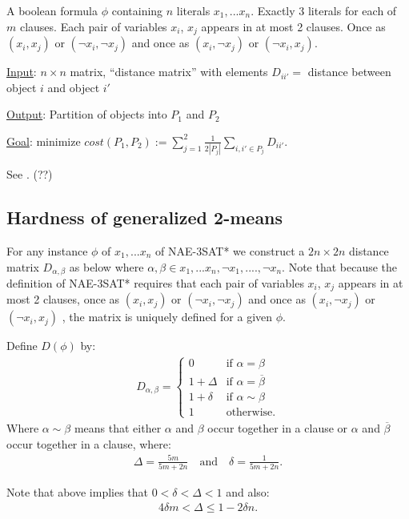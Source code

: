\begin{definition} 
A boolean formula $\phi$ containing $n$ literals $x_1,...x_n$.
Exactly 3 literals for each of $m$ clauses.  Each pair of variables
$x_i$, $x_j$ appears in at most 2 clauses.  Once as $(x_i,x_j)$ or
$(\neg x_i, \neg x_j)$ and once as  $(x_i,\neg x_j)$ or $(\neg x_i,
x_j)$. 
\end{definition}

\begin{definition}
\item \underline{Input}: $n \times n$ matrix, ``distance matrix'' with
    elements $D_{ii'} =$ distance between object $i$ and object $i'$
\item \underline{Output}: Partition of objects into $P_1$ and $P_2$
\item \underline{Goal}: minimize $cost(P_1,P_2) := \sum\limits_{j=1}^{2}
    \frac{1}{2|P_j|} \sum\limits_{i,i' \in P_j} D_{ii'}$. 
\end{definition}


\begin{lemma} \label{np-nae-3-sat}
See \cite{das2008}. (??)
\end{lemma}

\subsection{Hardness of generalized 2-means}

For any instance $\phi$ of $x_1,...x_n$ of NAE-3SAT* we construct a
$2n \times 2n$ distance matrix $D_{\alpha,\beta}$ as below where
$\alpha,\beta \in x_1,...x_n, \neg x_1,....,\neg x_n$.  Note that
because the definition of NAE-3SAT* requires that each pair of
variables $x_i$, $x_j$ appears in at most 2 clauses, once as
$(x_i,x_j)$ or $(\neg x_i, \neg x_j)$ and once as  $(x_i,\neg x_j)$ or
$(\neg x_i, x_j)$ , the matrix is uniquely defined for a given
$\phi$. 
\begin{definition} \label{2-means-distance-matrix} Define
  $D(\phi)$ by:
\begin{align}
  D_{\alpha,\beta} = \begin{cases}
    0 & \textrm{if } \alpha = \beta\\
    1+\Delta  & \mbox{if } \alpha = \overline{\beta} \\
    1+\delta  & \mbox{if } \alpha \sim \beta \\
    1 & \textrm{otherwise}.
  \end{cases}
\end{align}
Where $ \alpha \sim \beta$ means that either $\alpha$ and $\beta$
occur together in a clause or $\alpha$ and $\overline{\beta} $ occur
together in a clause, where:
\begin{align}
  \Delta = \frac{5m}{5m + 2n} \quad\textrm{and}
  \quad\delta = \frac{1}{5m  + 2n}.
\end{align}
\end{definition}
Note that above implies that $0 < \delta < \Delta < 1$ and also:
\begin{align}
4 \delta m < \Delta \le 1 - 2 \delta n.
\end{align}

